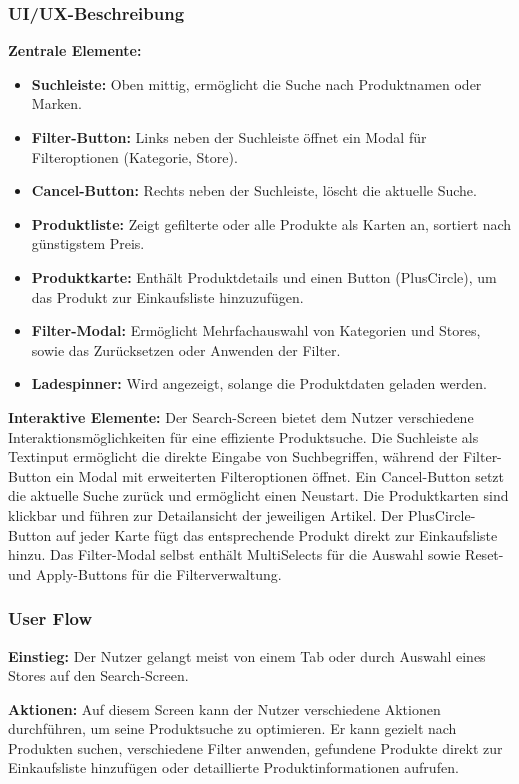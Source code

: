 \subsubsection{UI/UX-Beschreibung}

\textbf{Zentrale Elemente:}
\begin{itemize}
    \item \textbf{Suchleiste:} Oben mittig, ermöglicht die Suche nach Produktnamen oder Marken.
    \item \textbf{Filter-Button:} Links neben der Suchleiste öffnet ein Modal für Filteroptionen (Kategorie, Store).
    \item \textbf{Cancel-Button:} Rechts neben der Suchleiste, löscht die aktuelle Suche.
    \item \textbf{Produktliste:} Zeigt gefilterte oder alle Produkte als Karten an, sortiert nach günstigstem Preis.
    \item \textbf{Produktkarte:} Enthält Produktdetails und einen Button (PlusCircle), um das Produkt zur Einkaufsliste hinzuzufügen.
    \item \textbf{Filter-Modal:} Ermöglicht Mehrfachauswahl von Kategorien und Stores, sowie das Zurücksetzen oder Anwenden der Filter.
    \item \textbf{Ladespinner:} Wird angezeigt, solange die Produktdaten geladen werden.
\end{itemize}

\noindent\textbf{Interaktive Elemente:}
Der Search-Screen bietet dem Nutzer verschiedene Interaktionsmöglichkeiten für eine effiziente Produktsuche. Die Suchleiste als Textinput ermöglicht die direkte Eingabe von Suchbegriffen, während der Filter-Button ein Modal mit erweiterten Filteroptionen öffnet. Ein Cancel-Button setzt die aktuelle Suche zurück und ermöglicht einen Neustart. Die Produktkarten sind klickbar und führen zur Detailansicht der jeweiligen Artikel. Der PlusCircle-Button auf jeder Karte fügt das entsprechende Produkt direkt zur Einkaufsliste hinzu. Das Filter-Modal selbst enthält MultiSelects für die Auswahl sowie Reset- und Apply-Buttons für die Filterverwaltung.

\subsubsection{User Flow}
\textbf{Einstieg:} Der Nutzer gelangt meist von einem Tab oder durch Auswahl eines Stores auf den Search-Screen.

\noindent\textbf{Aktionen:} Auf diesem Screen kann der Nutzer verschiedene Aktionen durchführen, um seine Produktsuche zu optimieren. Er kann gezielt nach Produkten suchen, verschiedene Filter anwenden, gefundene Produkte direkt zur Einkaufsliste hinzufügen oder detaillierte Produktinformationen aufrufen.

